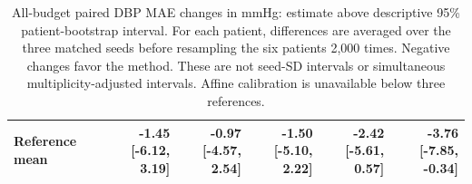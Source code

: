 \documentclass[11pt]{article}
\begin{document}
\begin{table}[!htbp]
\begin{tabular}{lrrrrr}
Reference mean & \shortstack{-1.45\\{[-6.12, 3.19]}} & \shortstack{-0.97\\{[-4.57, 2.54]}} & \shortstack{-1.50\\{[-5.10, 2.22]}} & \shortstack{-2.42\\{[-5.61, 0.57]}} & \shortstack{-3.76\\{[-7.85, -0.34]}}\\
\bottomrule\end{tabular}
\caption{All-budget paired DBP MAE changes in mmHg: estimate above descriptive 95\% patient-bootstrap interval. For each patient, differences are averaged over the three matched seeds before resampling the six patients 2,000 times. Negative changes favor the method. These are not seed-SD intervals or simultaneous multiplicity-adjusted intervals. Affine calibration is unavailable below three references.}\end{table}
\end{document}
